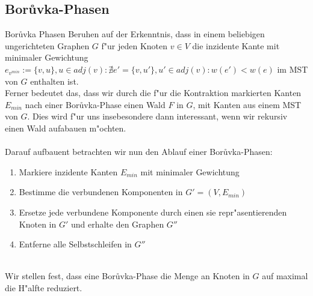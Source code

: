 \subsection{Bor\r uvka-Phasen}

Bor\r uvka Phasen Beruhen auf der Erkenntnis, dass in einem beliebigen 
    ungerichteten Graphen $G$ f"ur jeden Knoten $v \in V$ die inzidente Kante mit 
    minimaler Gewichtung 
    $e_{v^{min}} := \{v, u\}, u \in adj(v): 
        \nexists e' = \{v, u'\}, u' \in adj(v): w(e') < w(e)$
    im MST von $G$ enthalten ist.\\
Ferner bedeutet das, dass wir durch die f"ur die Kontraktion markierten Kanten
    $E_{min}$ nach einer Bor\r uvka-Phase einen Wald $F$ in $G$, mit Kanten aus 
    einem MST von $G$. Dies wird f"ur uns insebesondere dann interessant, wenn
    wir rekursiv einen Wald aufabauen m"ochten.\\
\\
Darauf aufbauent betrachten wir nun den Ablauf einer Bor\r uvka-Phasen:
\begin{enumerate}
    \item Markiere inzidente Kanten $E_{min}$ mit minimaler Gewichtung
    \item Bestimme die verbundenen Komponenten in $G' = (V,E_{min})$
    \item Ersetze jede verbundene Komponente durch einen sie repr"asentierenden
          Knoten in $G'$ und erhalte den Graphen $G''$
    \item Entferne alle Selbstschleifen in $G''$
\end{enumerate}
\ \\
Wir stellen fest, dass eine Bor\r uvka-Phase die Menge an Knoten in $G$ auf 
    maximal die H"alfte reduziert.\\
